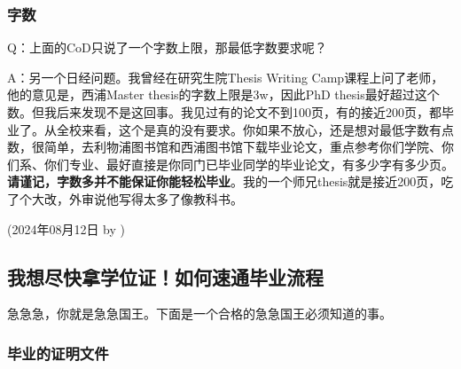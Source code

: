 \subsubsection{字数}

Q：上面的CoD只说了一个字数上限，那最低字数要求呢？

A：另一个日经问题。我曾经在研究生院Thesis Writing Camp课程上问了老师，他的意见是，西浦Master thesis的字数上限是3w，因此PhD thesis最好超过这个数。但我后来发现不是这回事。我见过有的论文不到100页，有的接近200页，都毕业了。从全校来看，这个是真的没有要求。你如果不放心，还是想对最低字数有点数，很简单，去利物浦图书馆和西浦图书馆下载毕业论文，重点参考你们学院、你们系、你们专业、最好直接是你同门已毕业同学的毕业论文，有多少字有多少页。\textbf{请谨记，字数多并不能保证你能轻松毕业}。我的一个师兄thesis就是接近200页，吃了个大改，外审说他写得太多了像教科书。

\begin{flushright}
    (2024年08月12日 by \Wu)
\end{flushright}



\subsection{我想尽快拿学位证！如何速通毕业流程}

急急急，你就是急急国王。下面是一个合格的急急国王必须知道的事。

\subsubsection{毕业的证明文件}

